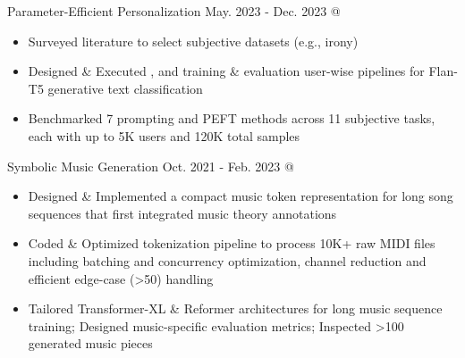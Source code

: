\cveventSameLine{}
    {Parameter-Efficient Personalization}
    {May. 2023 - Dec. 2023}{ @ }{}
\begin{itemize}

    \item Surveyed literature to select subjective datasets (e.g., irony)

    \item Designed \& Executed , 
    and  training \& evaluation user-wise pipelines for Flan-T5 generative text classification

    \item Benchmarked 7 prompting and PEFT methods across 11 subjective tasks, each with up to 5K users and 120K total samples
\end{itemize}
\dividerSmall




\cveventSameLine{}
    {Symbolic Music Generation}
    {Oct. 2021 - Feb. 2023}{ @ }
\begin{itemize}

    \item Designed \& Implemented a compact music token representation for long song sequences that first integrated
    music theory annotations

    \item Coded \& Optimized tokenization pipeline to process 10K+ raw MIDI files including batching and concurrency optimization, channel reduction and efficient edge-case (>50) handling

    \item Tailored Transformer-XL \& Reformer architectures for long music sequence training; Designed music-specific evaluation metrics; Inspected >100 generated music pieces
\end{itemize}
\dividerSmall





